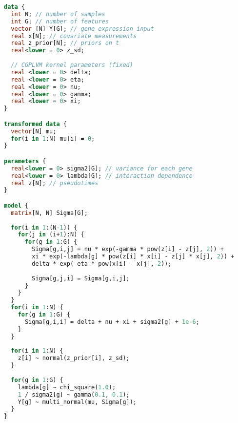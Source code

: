\begin{lstlisting}[language=Stan]
data {
  int N; // number of samples
  int G; // number of features
  vector [N] Y[G]; // gene expression input
  real x[N]; // covariate measurements
  real z_prior[N]; // priors on t
  real<lower = 0> z_sd;
  
  // CGPLVM kernel parameters (fixed)
  real <lower = 0> delta;
  real <lower = 0> eta;
  real <lower = 0> nu;
  real <lower = 0> gamma;
  real <lower = 0> xi;
}

transformed data {
  vector[N] mu;
  for(i in 1:N) mu[i] = 0;
}

parameters {
  real<lower = 0> sigma2[G]; // variance for each gene
  real<lower = 0> lambda[G]; // interaction dependence
  real z[N]; // pseudotimes
}

model {
  matrix[N, N] Sigma[G];
  
  for(i in 1:(N-1)) {
    for(j in (i+1):N) {
      for(g in 1:G) {
        Sigma[g,i,j] = nu * exp(-gamma * pow(z[i] - z[j], 2)) + 
        xi * exp(-lambda[g] * pow(z[i] * x[i] - z[j] * x[j], 2)) +
        delta * exp(-eta * pow(x[i] - x[j], 2));
        
        Sigma[g,j,i] = Sigma[g,i,j];
      }
    }
  }
  for(i in 1:N) {
    for(g in 1:G) {
      Sigma[g,i,i] = delta + nu + xi + sigma2[g] + 1e-6;
    }
  }
  
  for(i in 1:N) {
    z[i] ~ normal(z_prior[i], z_sd);
  }
  
  for(g in 1:G) {
    lambda[g] ~ chi_square(1.0);
    1 / sigma2[g] ~ gamma(0.1, 0.1);
    Y[g] ~ multi_normal(mu, Sigma[g]);
  }
}
\end{lstlisting}
